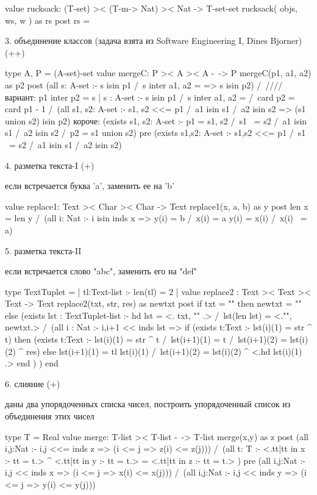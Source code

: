 \documentclass[14pt, twoside]{extreport}
\begin{document}
value  rucksack: (T-set) >< (T-m-> Nat) >< Nat -> T-set-set
rucksack( objs, ws, w ) as rs
post
rs = {


3. объединение классов (задача взята из Software Engineering I, Dines Bjorner)  (++)

type A, P = (A-set)-set
value mergeC: P >< A >< A -~-> P
mergeC(p1, a1, a2) as p2
post
(all s: A-set :- s isin p1 /\ s inter {a1, a2} = {} => s isin p2) /\  ////вариант: p1 inter p2 = { s | s : A-set :- s isin p1 /\ s inter {a1, a2} = {} } /\
card p2 = card p1 - 1 /\ (all s1, s2: A-set :- {s1, s2} <<= p1 /\ a1 isin s1 /\ a2 isin s2 => (s1 union s2) isin p2)
короче:
(exists s1, s2: A-set :- p1 = {s1, s2} /\ s1 ~= s2 /\ a1 isin s1 /\ a2 isin s2 /\ p2 = {s1 union s2})
pre
(exists s1,s2: A-set :- {s1,s2} <<= p1 /\ s1 ~= s2 /\ a1 isin s1 /\ a2 isin s2)

4.  разметка текста-I (+)

если встречается буква 'a', заменить ее на 'b'

value replace1: Text >< Char >< Char -> Text
replace1(x, a, b) as y
post
len x = len y /\
(all i: Nat :- i isin inds x => y(i) = b /\ x(i) = a \/ y(i) = x(i) /\ x(i) ~= a)

5. разметка текста-II

если встречается слово "abc", заменить его на "def"

type TextTuplet = {| tl:Text-list :- len(tl) = 2 |}
value
  replace2 : Text >< Text >< Text -> Text
  replace2(txt, str, res) as newtxt
  post
      if txt = "" then newtxt = ""
      else
         (exists lst : TextTuplet-list :-
            hd lst = <. txt, "" .> /\
   lst(len lst) = <."", newtxt.> /\
            (all i : Nat :- {i,i+1} << inds lst =>
if (exists t:Text :- lst(i)(1) = str ^ t)
then (exists t:Text :- lst(i)(1) = str ^ t /\ lst(i+1)(1) = t /\ lst(i+1)(2) = lst(i)(2) ^ res)
else lst(i+1)(1) = tl lst(i)(1) /\ lst(i+1)(2) = lst(i)(2) ^ <.hd lst(i)(1) .>
end
   )
         )
      end



6. слияние (+)

даны два упорядоченных списка чисел, построить упорядоченный список из объединения этих чисел

type T = Real
value merge: T-list >< T-list -~-> T-list
merge(x,y) as z
post
(all i,j:Nat :- {i,j} <<= inds z => (i <= j => z(i) <= z(j))) /\
(all t: T :- <.tt|tt in x :- tt = t.> ^ <.tt|tt in y :- tt = t.>  = <.tt|tt in z :- tt = t.> )
pre
(all i,j:Nat :- {i,j} << inds x => (i <= j => x(i) <= x(j))) /\
(all i,j:Nat :- {i,j} << inds y => (i <= j => y(i) <= y(j)))

}
\end{document}

